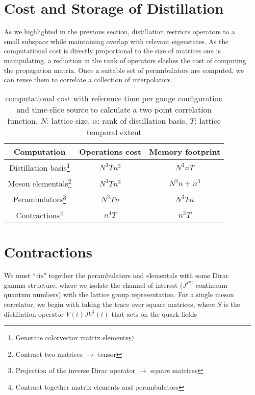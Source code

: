 \section{Cost and Storage of Distillation}
      As we highlighted in the previous section, distillation restricts operators to a small subspace while maintaining overlap with relevant eigenstates. As the computational cost is directly proportional to the size of matrices one is manipulating, a reduction in the rank of operators slashes the cost of computing the propagation matrix. Once a suitable set of perambulators are computed, we can reuse them to correlate a collection of interpolators.
        \begin{table}[H]
          \centering
        \begin{minipage}{\textwidth}
          \centering
        \begin{tabular}{ccc}
        Computation    & Operations cost & Memory footprint \\ \hline
        Distillation basis\footnote{Generate colorvector matrix elements}& $N^3Tn^3$         & $N^3nT$      \\
        Meson elementals\footnote{Contract two matrices $\to$ tensor} & $N^3Tn^3$      & $N^3n + n^3$  \\
        Perambulators\footnote{Projection of the inverse Dirac operator $\to$ square matrices} & $N^3Tn$   & $N^3Tn$            \\
        Contractions\footnote{Contract together matrix elements and perambulators}   & $n^4T$    & $n^{3}T$   
        \end{tabular}
        \end{minipage}
        \caption{computational cost with reference time per gauge configuration and time-slice source to calculate a two point correlation function. $N$: lattice size, $n$: rank of distillation basis, $T$: lattice temporal extent}
      \end{table}

  \section{Contractions}
  We must ``tie" together the perambulators and elementals with some Dirac gamma structure, where we isolate the channel of interest ($J^{PC}$ continuum quantum numbers) with the lattice group representation. For a single meson correlator, we begin with taking the trace over square matrices, where $S$ is the distillation operator $V(t)JV^{\dagger}(t)$ \cite{Neuendorf:2024ekv} that acts on the quark fields
  \\ 

